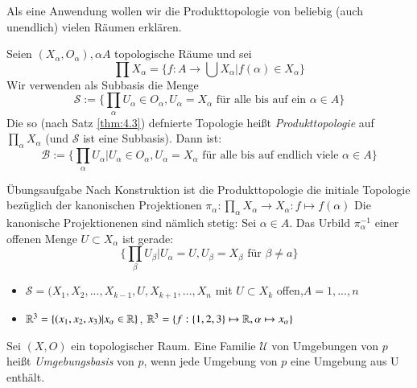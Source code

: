 \documentclass[a4paper,10pt]{scrartcl}
\renewcommand{\bigsqcap}{\prod}
\begin{document}
Als eine Anwendung wollen wir die Produkttopologie von beliebig (auch unendlich) vielen Räumen erklären.

Seien $(X_\alpha,O_\alpha), \alpha A$ topologische Räume und sei
\[
 \bigsqcap X_\alpha=\{f:A\to\bigcup X_\alpha|f(\alpha)\in X_\alpha\}
\]
Wir verwenden als Subbasis die Menge
\[
 \mathcal S:=\{\bigsqcap_\alpha U_\alpha\in O_\alpha, U_\alpha=X_\alpha \text{ für alle bis auf ein $\alpha \in A$}\}
\]
Die so (nach Satz \ref{thm:4.3}) defnierte Topologie heißt \emph{Produkttopologie} auf $\bigsqcap_\alpha X_\alpha$ (und 
$\mathcal S$ ist eine Subbasis). Dann ist:
\[
 \mathcal B := \{ \bigsqcap_\alpha U_\alpha|U_\alpha\in O_\alpha, U_\alpha=X_\alpha \text{ für alle bis auf endlich viele } \alpha \in A\}
\]
\begin{seg}{Übungsaufgabe}
 Nach Konstruktion ist die Produkttopologie die initiale Topologie bezüglich der kanonischen Projektionen $\pi_\alpha:\bigsqcap_\alpha X_\alpha\to X_\alpha: f\mapsto f(\alpha)$
Die kanonische Projektionenen sind nämlich stetig: Sei $\alpha \in A$. Das Urbild $\pi_\alpha^{-1}$ einer offenen Menge $U\subset X_\alpha$ ist gerade:
\[
 \{\bigsqcap_\beta U_\beta|U_\alpha=U, U_\beta=X_\beta \text{ für } \beta\neq a\}
\]

\end{seg}
\begin{note*}
 \begin{itemize}
  \item $\mathcal S=(X_1,X_2,...,X_{k-1}, U, X_{k+1},...,X_n$ mit $U\subset X_k$ offen,$A={1,...,n}$
  \item $\mathbb{R}^3=\{(x_1,x_2,x_3)|x_\alpha\in \mathbb{R}\}$, $\mathbb{R}^3=\{f:\{1,2,3\}\mapsto \mathbb{R}, \alpha\mapsto x_\alpha\}$
 \end{itemize}
\end{note*}
\begin{df}
 Sei $(X,O)$ ein topologischer Raum. Eine Familie $\mathcal U$ von Umgebungen von $p$ heißt \emph{Umgebungsbasis} von $p$, wenn jede Umgebung von $p$ eine Umgebung aus U enthält.
\fixme[fig25]
\end{df}
\end{document}
